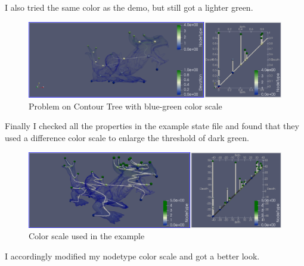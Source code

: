 \documentclass[12pt]{article}
\begin{document}
I also tried the same color as the demo, but still got a lighter green.
\begin{figure}[h]
\centering
\includegraphics[width=0.5\linewidth]{2-2.png}
\caption{Problem on Contour Tree with blue-green color scale}
\label{fig:name}
\end{figure}

Finally I checked all the properties in the example state file and found that they used a difference color scale to enlarge the threshold of dark green.
\begin{figure}[h]
\centering
\includegraphics[width=0.5\linewidth]{2-3.png}
\caption{Color scale used in the example}
\label{fig:name}
\end{figure}

I accordingly modified my nodetype color scale and got a better look.
\end{document}
